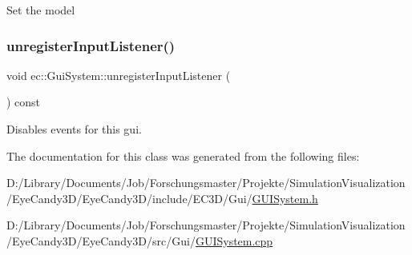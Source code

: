 Set the model \mbox{\label{classec_1_1_gui_system_a18d7d063334763b264da1392199f4c4e}} 
\subsubsection{\texorpdfstring{unregister\+Input\+Listener()}{unregisterInputListener()}}
{\footnotesize\ttfamily void ec\+::\+Gui\+System\+::unregister\+Input\+Listener (\begin{DoxyParamCaption}{ }\end{DoxyParamCaption}) const}

Disables events for this gui. 

The documentation for this class was generated from the following files\+:\begin{DoxyCompactItemize}
\item 
D\+:/\+Library/\+Documents/\+Job/\+Forschungsmaster/\+Projekte/\+Simulation\+Visualization/\+Eye\+Candy3\+D/\+Eye\+Candy3\+D/include/\+E\+C3\+D/\+Gui/\mbox{\hyperlink{_g_u_i_system_8h}{G\+U\+I\+System.\+h}}\item 
D\+:/\+Library/\+Documents/\+Job/\+Forschungsmaster/\+Projekte/\+Simulation\+Visualization/\+Eye\+Candy3\+D/\+Eye\+Candy3\+D/src/\+Gui/\mbox{\hyperlink{_g_u_i_system_8cpp}{G\+U\+I\+System.\+cpp}}\end{DoxyCompactItemize}

